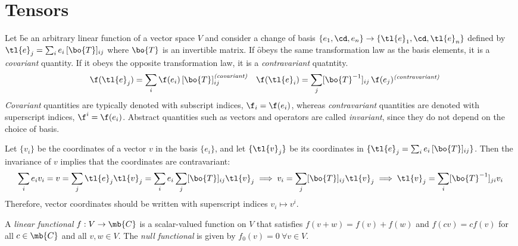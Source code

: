 \documentclass[11pt,fleqn]{article}
\numberwithin{equation}{section}
\begin{document}
\tableofcontents

\section{Tensors}\label{sec-tensors}

\begin{dfn}
Let \f be an arbitrary linear function of a vector space $V$ and consider a change of basis $\{e_1,\cd,e_n\}\rightarrow\{\tl{e}_1,\cd,\tl{e}_n\}$ defined by $\tl{e}_j = \sum_ie_i\,[\bo{T}]_{ij}$ where $\bo{T}$ is an invertible matrix.
If \f obeys the same transformation law as the basis elements, it is a \textit{covariant} quantity.
If it obeys the opposite transformation law, it is a \textit{contravariant} quatntity.
\begin{align}
&&
  \f(\tl{e}_j)=\sum_i\f(e_i)\,[\bo{T}]_{ij}
\sp\text{\textit{(covariant)}}
&&
  \f(\tl{e}_i)=\sum_j[\bo{T}^{-1}]_{ij}\,\f(e_j)
\sp\text{\textit{(contravariant)}}
\end{align}
\textit{Covariant} quantities are typically denoted with subscript indices, $\f_i=\f(e_i)$, whereas \textit{contravariant} quantities are denoted with superscript indices, $\f^i=\f(e_i)$.
Abstract quantities such as vectors and operators are called \textit{invariant}, since they do not depend on the choice of basis.
\end{dfn}

\begin{ex}\label{vector-coordinates-are-contravariant}
Let $\{v_i\}$ be the coordinates of a vector $v$ in the basis $\{e_i\}$, and let $\{\tl{v}_j\}$ be its coordinates in $\{\tl{e}_j=\sum_ie_i\,[\bo{T}]_{ij}\}$.
Then the invariance of $v$ implies that the coordinates are contravariant:
\begin{align*}
  \sum_ie_iv_i=v=\sum_j\tl{e}_j\tl{v}_j
=
  \sum_ie_i\sum_j[\bo{T}]_{ij}\tl{v}_j
\implies
  v_i
=
  \sum_j[\bo{T}]_{ij}\tl{v}_j
\implies
  \tl{v}_j
=
  \sum_i[\bo{T}^{-1}]_{ji}v_i
\end{align*}
Therefore, vector coordinates should be written with superscript indices $v_i\mapsto v^i$.
\end{ex}

\begin{dfn}
A \textit{linear functional} $f:V\rightarrow\mb{C}$ is a scalar-valued function on $V$ that satisfies $f(v+w)=f(v)+f(w)$ and $f(cv)=cf(v)$ for all $c\in\mb{C}$ and all $v,w\in V$.
The \textit{null functional} is given by $f_0(v)=0\ \forall v\in V$.
\end{dfn}
\end{document}
